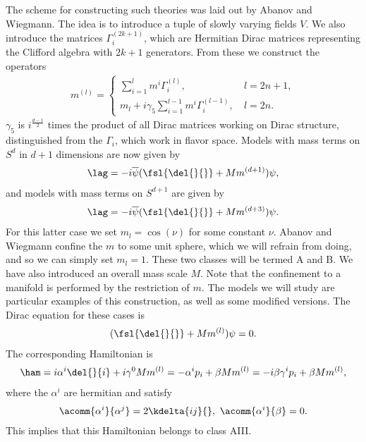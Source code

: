 The scheme for constructing such theories was laid out by Abanov and Wiegmann. The idea is to introduce a tuple of slowly varying fields $V$. We also introduce the matrices $\Gamma_{i}^{(2k + 1)}$, which are Hermitian Dirac matrices representing the Clifford algebra with $2k + 1$ generators. From these we construct the operators
\begin{align*}
	m^{(l)} = \begin{cases}
		\sum\limits_{i = 1}^{l}m^{i}\Gamma^{(l)}_{i},\ &l = 2n + 1, \\
		m_{l} + i\gamma_{5}\sum\limits_{i = 1}^{l - 1}m^{i}\Gamma^{(l - 1)}_{i},\ &l = 2n.
	\end{cases}
\end{align*}
$\gamma_{5}$ is $i^{\frac{d - 1}{2}}$ times the product of all Dirac matrices working on Dirac structure, distinguished from the $\Gamma_{i}$, which work in flavor space. Models with mass terms on $S^{d}$ in $d + 1$ dimensions are now given by
\begin{align*}
	\lag = -i\overline{\psi}(\fsl{\del{}{}} + Mm^{(d + 1)})\psi,
\end{align*}
and models with mass terms on $S^{d + 1}$ are given by
\begin{align*}
	\lag = -i\overline{\psi}(\fsl{\del{}{}} + Mm^{(d + 3)})\psi.
\end{align*}
For this latter case we set $m_{l} = \cos(\nu)$ for some constant $\nu$. Abanov and Wiegmann confine the $m$ to some unit sphere, which we will refrain from doing, and so we can simply set $m_{l} = 1$. These two classes will be termed A and B. We have also introduced an overall mass scale $M$. Note that the confinement to a manifold is performed by the restriction of $m$. The models we will study are particular examples of this construction, as well as some modified versions. The Dirac equation for these cases is
\begin{align*}
	(\fsl{\del{}{}} + Mm^{(l)})\psi = 0.
\end{align*}
The corresponding Hamiltonian is
\begin{align*}
	\ham = i\alpha^{i}\del{}{i} + i\gamma^{0}Mm^{(l)} = -\alpha^{i}p_{i} + \beta Mm^{(l)} = -i\beta\gamma^{i}p_{i} + \beta Mm^{(l)},
\end{align*}
where the $\alpha^{i}$ are hermitian and satisfy
\begin{align*}
	\acomm{\alpha^{i}}{\alpha^{j}} = 2\kdelta{ij}{},\ \acomm{\alpha^{i}}{\beta} = 0.
\end{align*}
This implies that this Hamiltonian belongs to class AIII.

